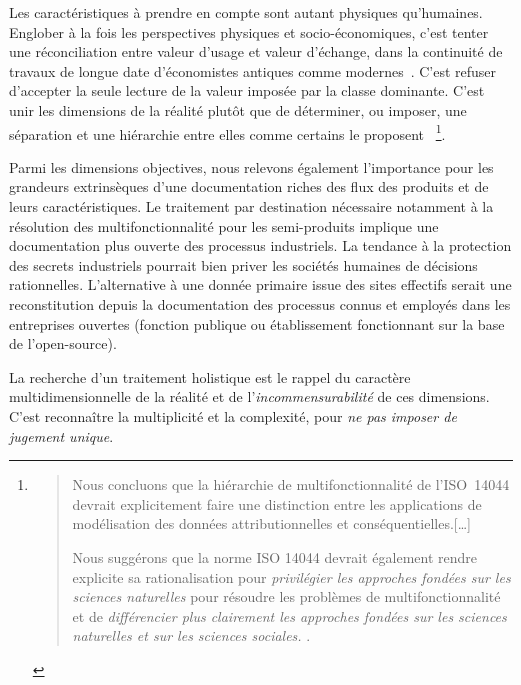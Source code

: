 Les caractéristiques à prendre en compte sont autant physiques qu'humaines.
Englober à la fois les perspectives physiques et socio-économiques, c'est tenter une réconciliation entre valeur d'usage et valeur d'échange, dans la continuité de travaux de longue date d'économistes antiques comme modernes~\cite{harribey_richesse_2013}.
C'est refuser d'accepter la seule lecture de la valeur imposée par la classe dominante.
C'est unir les dimensions de la réalité plutôt que de déterminer, ou imposer, une séparation et une hiérarchie entre elles comme certains le proposent~\cite{pelletier_rationales_2014}
\footnote{
\blockcquote[traduction]{pelletier_rationales_2014}{
Nous concluons que la hiérarchie de multifonctionnalité de l'ISO~14044 devrait explicitement faire une distinction entre les applications de modélisation des données attributionnelles et conséquentielles.[\ldots]

Nous suggérons que la norme ISO 14044 devrait également rendre explicite sa rationalisation pour \emph{privilégier les approches fondées sur les sciences naturelles} pour résoudre les problèmes de multifonctionnalité et de \emph{différencier plus clairement les approches fondées sur les sciences naturelles et  sur les sciences sociales.}
.}
}.

Parmi les dimensions objectives, nous relevons également l'importance pour les grandeurs extrinsèques d'une documentation riches des flux des produits et de leurs caractéristiques.
Le traitement par destination nécessaire notamment à la résolution des multifonctionnalité pour les semi-produits implique une documentation plus ouverte des processus industriels.
La tendance à la protection des secrets industriels pourrait bien priver les sociétés humaines de décisions rationnelles.
L'alternative à une donnée primaire issue des sites effectifs serait une reconstitution depuis la documentation des processus connus et employés dans les entreprises ouvertes (fonction publique ou établissement fonctionnant sur la base de l'open-source).

La recherche d'un traitement holistique est le rappel du caractère multidimensionnelle de la réalité et de l'\emph{incommensurabilité} de ces dimensions.
C'est reconnaître la multiplicité et la complexité, pour \emph{ne pas imposer de jugement unique}.

